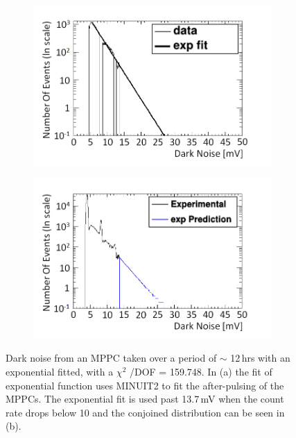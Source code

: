 \begin{figure}[!h]
\centering
\begin{subfigure}{.5\textwidth}
  \centering
  \includegraphics[width=\linewidth]{Chapter4/Figs/Raster/fit_of_dark_noiseMedText.png}
  \captionsetup{width=.9\linewidth}
  \caption{}
  \label{subFig:expFitOfDark}
\end{subfigure}%
\begin{subfigure}{.5\textwidth}
  \centering
  \includegraphics[width=\linewidth]{Chapter4/Figs/Raster/fittedDarkNoise_outputMedText.png}
  \captionsetup{width=.9\linewidth}
  \caption{}
  \label{subFig:fittedDarkNoise}
\end{subfigure}
\caption[Dark noise from an MPPC with an exponential fitted to the tail.]{Dark noise from an MPPC taken over a period of $\sim$ 12\,hrs with an exponential fitted, with a $\chi ^2$ /DOF = 159.748. In (a) the fit of exponential function uses MINUIT2 to fit the after-pulsing of the MPPCs. The exponential fit is used past 13.7\,mV when the count rate drops below 10 and the conjoined distribution can be seen in (b).}
\label{fig:fitting_of_non_peak_dark_noise}
\end{figure}

